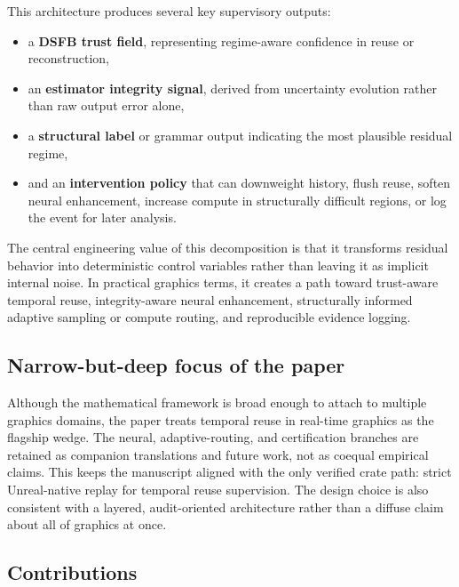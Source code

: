 \documentclass[11pt,letterpaper]{article}
\theoremstyle{gcresult}
\theoremstyle{definition}
\begin{document}
This architecture produces several key supervisory outputs:
\begin{itemize}[leftmargin=1.5em]
    \item a \textbf{DSFB trust field}, representing regime-aware confidence in reuse or reconstruction,
    \item an \textbf{estimator integrity signal}, derived from uncertainty evolution rather than raw output error alone,
    \item a \textbf{structural label} or grammar output indicating the most plausible residual regime,
    \item and an \textbf{intervention policy} that can downweight history, flush reuse, soften neural enhancement, increase compute in structurally difficult regions, or log the event for later analysis.
\end{itemize}

The central engineering value of this decomposition is that it transforms residual behavior into deterministic control variables rather than leaving it as implicit internal noise. In practical graphics terms, it creates a path toward trust-aware temporal reuse, integrity-aware neural enhancement, structurally informed adaptive sampling or compute routing, and reproducible evidence logging.


\subsection{Narrow-but-deep focus of the paper}

Although the mathematical framework is broad enough to attach to multiple graphics domains, the paper treats temporal reuse in real-time graphics as the flagship wedge. The neural, adaptive-routing, and certification branches are retained as companion translations and future work, not as coequal empirical claims. This keeps the manuscript aligned with the only verified crate path: strict Unreal-native replay for temporal reuse supervision. The design choice is also consistent with a layered, audit-oriented architecture rather than a diffuse claim about all of graphics at once. 


\subsection{Contributions}
\end{document}
